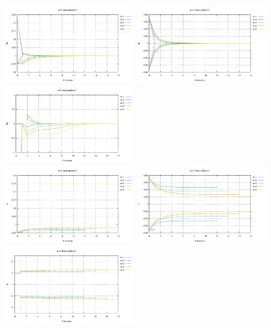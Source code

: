 \begin{center}
\includegraphics[width=5.7cm]{python_codes/fieldstone_87/results/experiment_01/du_meth3.pdf}
\includegraphics[width=5.7cm]{python_codes/fieldstone_87/results/experiment_01/dv_meth3.pdf}
\includegraphics[width=5.7cm]{python_codes/fieldstone_87/results/experiment_01/dp_meth3.pdf}\\
\includegraphics[width=5.7cm]{python_codes/fieldstone_87/results/experiment_01/u_meth3.pdf}
\includegraphics[width=5.7cm]{python_codes/fieldstone_87/results/experiment_01/v_meth3.pdf}
\includegraphics[width=5.7cm]{python_codes/fieldstone_87/results/experiment_01/p_meth3.pdf}
\end{center}





